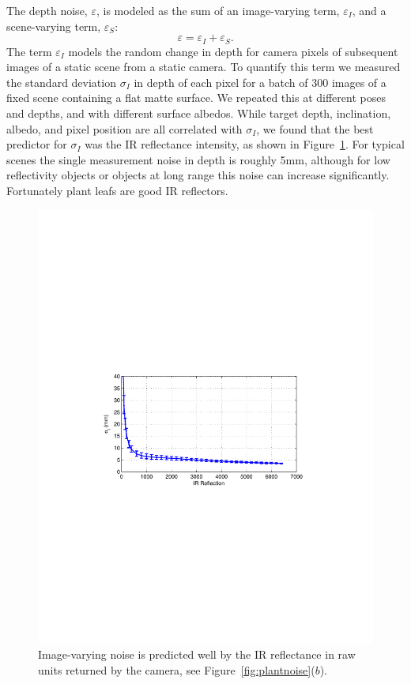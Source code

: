 The depth noise, $\varepsilon$, is modeled as the sum of an image-varying term, $\varepsilon_I$, and a scene-varying term, $\varepsilon_S$:
\begin{equation}
\varepsilon = \varepsilon_I + \varepsilon_S. \label{eq:epsilon}
\end{equation}
The term $\varepsilon_I$ models the random change in depth for camera pixels of subsequent images of a static scene from a static camera.  To quantify this term we measured the standard deviation $\sigma_I$ in depth of each pixel for a batch of 300 images of a fixed scene containing a flat matte surface.  We repeated this at different poses and depths, and with different surface albedos.  While target depth, inclination, albedo, and pixel position are all correlated with $\sigma_I$, we found that the best predictor for $\sigma_I$ was the IR reflectance intensity, as shown in Figure~\ref{fig:sigmainterframe}.  For typical scenes the single measurement noise in depth is roughly 5mm, although for low reflectivity objects or objects at long range this noise can increase significantly.  Fortunately plant leafs are good IR reflectors.

\begin{figure}
\begin{center}
   \includegraphics[trim=120 280 110 290,clip,width=0.9\linewidth]{Figures/SigmaInterframe}
\end{center}
   \caption{Image-varying noise is predicted well by the IR reflectance in raw units returned by the camera, see Figure~\ref{fig:plantnoise}($b$).}
\label{fig:sigmainterframe}
\end{figure}

